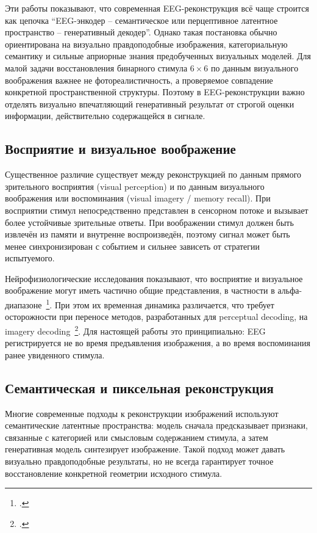 Эти работы показывают, что современная EEG-реконструкция всё чаще строится как цепочка ``EEG-энкодер -- семантическое или перцептивное латентное пространство -- генеративный декодер''. Однако такая постановка обычно ориентирована на визуально правдоподобные изображения, категориальную семантику и сильные априорные знания предобученных визуальных моделей. Для малой задачи восстановления бинарного стимула $6 \times 6$ по данным визуального воображения важнее не фотореалистичность, а проверяемое совпадение конкретной пространственной структуры. Поэтому в EEG-реконструкции важно отделять визуально впечатляющий генеративный результат от строгой оценки информации, действительно содержащейся в сигнале.

\subsection{Восприятие и визуальное воображение}

Существенное различие существует между реконструкцией по данным прямого зрительного восприятия (visual perception) и по данным визуального воображения или воспоминания (visual imagery / memory recall). При восприятии стимул непосредственно представлен в сенсорном потоке и вызывает более устойчивые зрительные ответы. При воображении стимул должен быть извлечён из памяти и внутренне воспроизведён, поэтому сигнал может быть менее синхронизирован с событием и сильнее зависеть от стратегии испытуемого.

Нейрофизиологические исследования показывают, что восприятие и визуальное воображение могут иметь частично общие представления, в частности в альфа-диапазоне~\footcite{10.1016/j.cub.2020.04.074}. При этом их временная динамика различается, что требует осторожности при переносе методов, разработанных для perceptual decoding, на imagery decoding~\footcite{10.7554/elife.33904}. Для настоящей работы это принципиально: EEG регистрируется не во время предъявления изображения, а во время воспоминания ранее увиденного стимула.

\subsection{Семантическая и пиксельная реконструкция}

Многие современные подходы к реконструкции изображений используют семантические латентные пространства: модель сначала предсказывает признаки, связанные с категорией или смысловым содержанием стимула, а затем генеративная модель синтезирует изображение. Такой подход может давать визуально правдоподобные результаты, но не всегда гарантирует точное восстановление конкретной геометрии исходного стимула.

